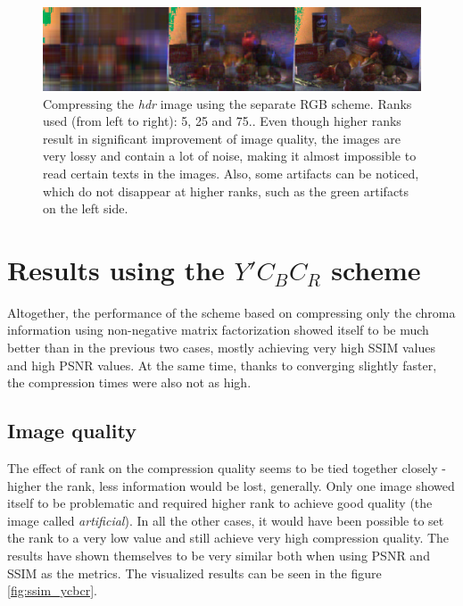 \documentclass[thesis=M,english]{FITthesis}[2012/10/20]
\begin{document}
\begin{figure}[h]
  \centering
  \includegraphics[scale=0.5]{imgs/results/hdr_imgqual_separate}
  \caption[Separate RGB scheme images with different ranks]{Compressing the \emph{hdr} image using the separate RGB scheme.
           Ranks used (from left to right): 5, 25 and 75.. Even though
           higher ranks result in significant improvement of image
           quality, the images are very lossy and contain a lot of noise, making it
           almost impossible to read certain texts in the images. Also,
           some artifacts can be noticed, which do not disappear at higher ranks,
           such as the green artifacts on the left side.}
  \label{fig:separate_imgqual}
\end{figure}


\section{Results using the $Y'C_BC_R$ scheme}
Altogether, the performance of the scheme based on compressing only the chroma
information using non-negative matrix factorization showed itself to be much
better than in the previous two cases, mostly achieving very high SSIM values
and high PSNR values. At the same time, thanks to converging slightly faster,
the compression times were also not as high.

\subsection{Image quality}
The effect of rank on the compression quality seems to be tied together closely
- higher the rank, less information would be lost, generally. Only one image
showed itself to be problematic and required higher rank to achieve good quality (the image called
\emph{artificial}). In all the other cases, it would have been possible to set the
rank to a very low value and still achieve very high compression quality. The results have
shown themselves to be very similar both when using PSNR and SSIM as the metrics. The
visualized results can be seen in the figure \ref{fig:ssim_ycbcr}.
\end{document}
